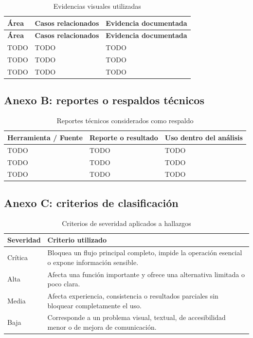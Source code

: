 \documentclass[11pt,spanish]{article}
\begin{document}
\begin{longtable}{p{3cm} p{4.2cm} p{7cm}}
\caption{Evidencias visuales utilizadas}\label{tab:anexo-evidencias}\\[-0.5em]
\toprule
\textbf{Área} & \textbf{Casos relacionados} & \textbf{Evidencia documentada} \\
\midrule
\endfirsthead
\toprule
\textbf{Área} & \textbf{Casos relacionados} & \textbf{Evidencia documentada} \\
\midrule
\endhead
TODO & TODO & TODO \\
TODO & TODO & TODO \\
TODO & TODO & TODO \\
\bottomrule
\end{longtable}

\subsection{Anexo B: reportes o respaldos técnicos}

\begin{table}[H]
\centering
\caption{Reportes técnicos considerados como respaldo}
\label{tab:anexo-reportes}
\begin{tabularx}{\textwidth}{p{3.8cm} p{4.2cm} Y}
\toprule
\textbf{Herramienta / Fuente} & \textbf{Reporte o resultado} & \textbf{Uso dentro del análisis} \\
\midrule
TODO & TODO & TODO \\
TODO & TODO & TODO \\
TODO & TODO & TODO \\
\bottomrule
\end{tabularx}
\end{table}

\subsection{Anexo C: criterios de clasificación}

\begin{table}[H]
\centering
\caption{Criterios de severidad aplicados a hallazgos}
\label{tab:anexo-severidad}
\begin{tabularx}{\textwidth}{p{3cm} Y}
\toprule
\textbf{Severidad} & \textbf{Criterio utilizado} \\
\midrule
Crítica & Bloquea un flujo principal completo, impide la operación esencial o expone información sensible. \\
Alta & Afecta una función importante y ofrece una alternativa limitada o poco clara. \\
Media & Afecta experiencia, consistencia o resultados parciales sin bloquear completamente el uso. \\
Baja & Corresponde a un problema visual, textual, de accesibilidad menor o de mejora de comunicación. \\
\bottomrule
\end{tabularx}
\end{table}
\end{document}
